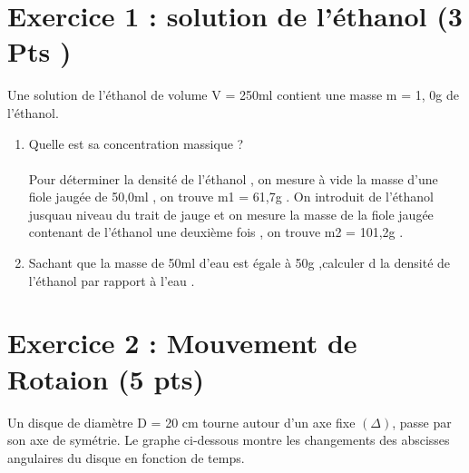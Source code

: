 \documentclass[12pt]{article}
\begin{document}
 \section*{Exercice 1 : solution de l’éthanol (3 Pts )}

Une solution de l’éthanol de volume V = 250ml contient une masse m = 1, 0g de l’éthanol.
\begin{enumerate}
\item Quelle est sa concentration massique ?\\\\
Pour déterminer la densité de l’éthanol , on mesure à vide la masse d’une fiole jaugée de 50,0ml , on trouve m1 = 61,7g . On introduit de l’éthanol jusquau niveau du trait de jauge et on mesure la masse de la fiole jaugée contenant de l’éthanol une deuxième fois , on trouve m2 = 101,2g .
\item Sachant que la masse de 50ml d’eau est égale à 50g ,calculer d la densité de l’éthanol
par rapport à l’eau .
\end{enumerate}

 \section*{Exercice 2 : Mouvement de Rotaion (5 pts)}
Un disque de diamètre D = 20 cm tourne autour d'un axe fixe $(\Delta)$, passe par son axe de symétrie. Le graphe ci-dessous montre les changements des abscisses angulaires du disque en fonction de temps.
\end{document}
